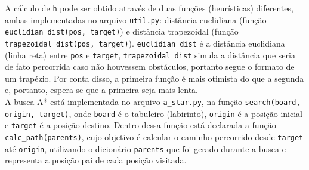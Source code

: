 \documentclass[12pt]{article}
\begin{document}
A cálculo de \verb|h| pode ser obtido através de duas funções (heurísticas) diferentes, ambas implementadas no arquivo \verb|util.py|: distância euclidiana (função \verb|euclidian_dist(pos, target)|) e distância trapezoidal (função \verb|trapezoidal_dist(pos, target)|). \verb|euclidian_dist| é a distância euclidiana (linha reta) entre \verb|pos| e \verb|target|, \verb|trapezoidal_dist| simula a distância que seria de fato percorrida caso não houvessem obstáculos, portanto segue o formato de um trapézio. Por conta disso, a primeira função é mais otimista do que a segunda e, portanto, espera-se que a primeira seja mais lenta.\\

A busca A* está implementada no arquivo \verb|a_star.py|, na função \verb|search(board, origin, target)|, onde \verb|board| é o tabuleiro (labirinto), \verb|origin| é a posição inicial e \verb|target| é a posição destino. Dentro dessa função está declarada a função \verb|calc_path(parents)|, cujo objetivo é calcular o caminho percorrido desde \verb|target| até \verb|origin|, utilizando o dicionário \verb|parents| que foi gerado durante a busca e representa a posição pai de cada posição visitada.\\
\end{document}
